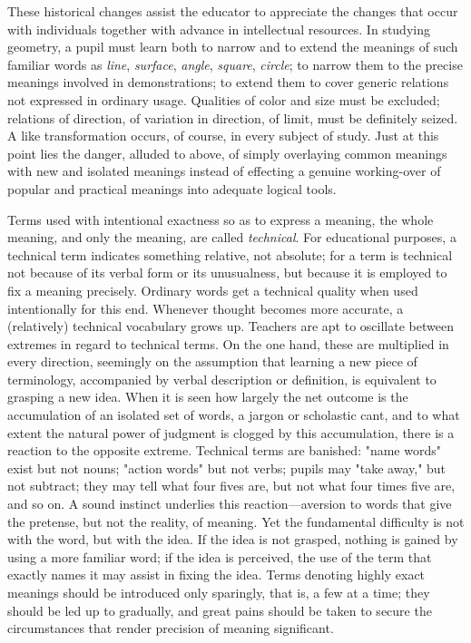 \documentclass[letterpaper]{book}
\begin{document}

These historical changes assist the educator to appreciate the changes
that occur with individuals together with advance in intellectual
resources. In
studying
geometry, a pupil must learn both to narrow and to extend the meanings
of such familiar words as \emph{line}, \emph{surface}, \emph{angle},
\emph{square}, \emph{circle}; to narrow them to the precise meanings
involved in demonstrations; to extend them to cover generic relations
not expressed in ordinary usage. Qualities of color and size must be
excluded; relations of direction, of variation in direction, of limit,
must be definitely seized. A like transformation occurs, of course, in
every subject of study. Just at this point lies the danger, alluded to
above, of simply overlaying common meanings with new and isolated
meanings instead of effecting a genuine working-over of popular and
practical meanings into adequate logical tools.


Terms used with intentional exactness so as to express a meaning, the
whole meaning, and only the meaning, are called \emph{technical}. For
educational purposes, a technical term indicates something relative, not
absolute; for a term is technical not because of its verbal form or its
unusualness, but because it is employed to fix a meaning precisely.
Ordinary words get a technical quality when used intentionally for this
end. Whenever thought becomes more accurate, a (relatively) technical
vocabulary grows up. Teachers are apt to oscillate between extremes in
regard to technical terms. On the one hand, these are multiplied in
every direction, seemingly on the assumption that learning a new piece
of terminology, accompanied by verbal description or definition, is
equivalent to grasping a new idea. When it is seen how largely the net
outcome is the accumulation of an isolated set of words, a jargon or
scholastic cant, and to what extent the natural power of judgment is
clogged by this accumulation, there is a reaction to the opposite
extreme. Technical terms are
banished:
"name words" exist but not nouns; "action words" but not verbs; pupils
may "take away," but not subtract; they may tell what four fives are,
but not what four times five are, and so on. A sound instinct underlies
this reaction---aversion to words that give the pretense, but not the
reality, of meaning. Yet the fundamental difficulty is not with the
word, but with the idea. If the idea is not grasped, nothing is gained
by using a more familiar word; if the idea is perceived, the use of the
term that exactly names it may assist in fixing the idea. Terms denoting
highly exact meanings should be introduced only sparingly, that is, a
few at a time; they should be led up to gradually, and great pains
should be taken to secure the circumstances that render precision of
meaning significant.
\end{document}
